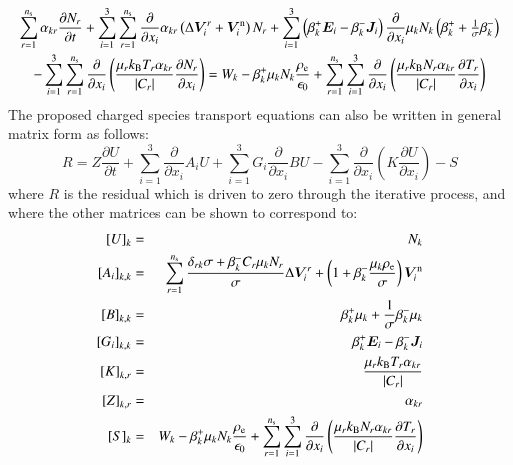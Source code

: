 \documentclass[twoside,onecolumn,10pt]{waflarticle}
\renewcommand{\vec}[1]{\bm{#1}}
\newcommand{\alb}{\vspace{0.1cm}\\} %
\newcommand{\mfd}{\displaystyle}
\newcommand{\ns}{{n_{\rm s}}}
\renewcommand{\vec}[1]{\bm{ #1 }}
\begin{document}
\begin{equation}
\begin{array}{l}\mfd
  \sum_{r=1}^{\ns} \alpha_{kr} \frac{\partial N_r}{\partial t}  
+ \sum_{i=1}^3 \sum_{r=1}^\ns  \frac{\partial}{\partial x_i}      \alpha_{kr} \left( \Delta \vec{V}_i^r + \vec{V}^{\rm n}_i \right)N_r
+  \sum_{i=1}^3 \left( \beta_k^+ \vec{E}_i- \beta_k^- \vec{J}_i   \right) \frac{\partial}{\partial x_i}  \mu_{k} N_{k} \left( \beta_k^+ + {\textstyle \frac{1}{\sigma}} \beta_k^-  
\right) 
\alb\mfd~~~~
- \sum_{i=1}^3 \sum_{r=1}^{\ns} \frac{\partial}{\partial x_i} \left(\frac{\mu_r k_{\rm B} T_r \alpha_{kr}}{|C_r|}  \frac{\partial N_r}{\partial x_i}\right) 
= W_k
-\beta_k^+ \mu_{k} N_{k}\frac{\rho_{\rm e}}{\epsilon_0}  
+ \sum_{r=1}^\ns \sum_{i=1}^3  \frac{\partial}{\partial x_i} \left( \frac{\mu_r k_{\rm B} N_r  \alpha_{kr}}{|C_r|}   \frac{\partial T_r}{\partial x_i} \right)
\end{array}
\label{eqn:positivenegativespecies}
\end{equation}
%
The proposed charged species transport equations can also be written in general matrix form as follows:
%
\begin{equation}
  R=Z\frac{\partial U}{\partial t} + \sum_{i=1}^3\frac{\partial}{\partial x_i} A_i U
    + \sum_{i=1}^3 G_i \frac{\partial}{\partial x_i} B U - \sum_{i=1}^3  \frac{\partial}{\partial x_i} \left( K \frac{\partial U}{\partial x_i} \right)-S
\label{eqn:Rproposed}
\end{equation}
%
where $R$ is the residual which is driven to zero through the iterative process, and where the other matrices can be shown to correspond to:
%
\begin{eqnarray}
 \left[U\right]_k&=&N_k \alb
 \left[A_i\right]_{k,k}&=&\sum_{r=1}^\ns \frac{\delta_{rk}\sigma+\beta_k^- C_r  \mu_k N_r}{\sigma} \Delta \vec{V}_i^r + \left(1+\beta_k^- \frac{\mu_k\rho_{\rm e}}{\sigma}\right)\vec{V}^{\rm n}_i \alb
 \left[B\right]_{k,k}&=&\beta_k^+ \mu_k + \frac{1}{\sigma}\beta_k^- \mu_k \alb
 \left[G_i\right]_{k,k}&=&\beta_k^+ \vec{E}_i - \beta_k^- \vec{J}_i \alb
 \left[K\right]_{k,r} &=& \frac{\mu_r k_{\rm B} T_r \alpha_{kr}}{|C_r|} \alb
 \left[Z\right]_{k,r} &=& \alpha_{kr} \alb
 \left[S\right]_k &=& W_k -\beta_k^+ \mu_{k} N_{k}\frac{\rho_{\rm e}}{\epsilon_0} 
+ \sum_{r=1}^\ns \sum_{i=1}^3  \frac{\partial}{\partial x_i} \left( \frac{\mu_r k_{\rm B} N_r \alpha_{kr}}{|C_r|}  \frac{\partial T_r}{\partial x_i} \right)
\end{eqnarray}
\end{document}
